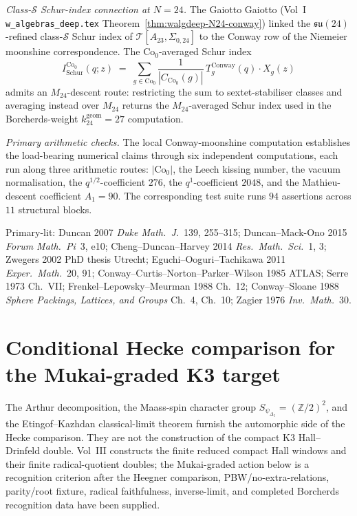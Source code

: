 \begin{remark}
\emph{Class-$\mathcal{S}$ Schur-index connection at $N = 24$.} The Gaiotto
Gaiotto (Vol~I \texttt{w\_algebras\_deep.tex}
Theorem~\ref{thm:walgdeep-N24-conway}) linked the
$\mathfrak{su}(24)$-refined class-$\mathcal{S}$ Schur index of
$\mathcal T[A_{23}, \Sigma_{0, 24}]$ to the Conway row of the Niemeier
moonshine correspondence. The $\mathrm{Co}_0$-averaged Schur index
\[
 I_{\mathrm{Schur}}^{\mathrm{Co}_0}(q; z)
 \;=\;
 \sum_{g \in \mathrm{Co}_0}
 \frac{1}{|C_{\mathrm{Co}_0}(g)|}\,
 T_g^{\mathrm{Conway}}(q) \cdot X_g(z)
\]
admits an $M_{24}$-descent route: restricting the sum to sextet-stabiliser
classes and averaging instead over $M_{24}$ returns the
$M_{24}$-averaged Schur index used in the Borcherds-weight
$k_{24}^{\mathrm{geom}} = 27$ computation.

\emph{Primary arithmetic checks.}
The local Conway-moonshine computation establishes the load-bearing
numerical claims through six independent
computations, each run along three arithmetic routes:
$|\mathrm{Co}_0|$, the Leech kissing number, the vacuum normalisation,
the $q^{1/2}$-coefficient $276$, the $q^{1}$-coefficient $2048$, and
the Mathieu-descent coefficient $A_1 = 90$. The corresponding test
suite runs $94$ assertions across $11$ structural blocks.

Primary-lit: Duncan 2007 \emph{Duke Math.\ J.}~139, 255--315;
Duncan--Mack-Ono 2015 \emph{Forum Math.\ Pi}~3, e10;
Cheng--Duncan--Harvey 2014 \emph{Res.~Math.~Sci.}~1, 3;
Zwegers 2002 PhD thesis Utrecht;
Eguchi--Ooguri--Tachikawa 2011 \emph{Exper.~Math.}~20, 91;
Conway--Curtis--Norton--Parker--Wilson 1985 ATLAS; Serre 1973 Ch.~VII;
Frenkel--Lepowsky--Meurman 1988 Ch.~12;
Conway--Sloane 1988 \emph{Sphere Packings, Lattices, and Groups} Ch.~4, Ch.~10;
Zagier 1976 \emph{Inv.~Math.}~30.
\end{remark}

\section{Conditional Hecke comparison for the Mukai-graded K3 target}
\label{sec:dl-tempered-hecke}

The Arthur decomposition, the Maass-spin character group
$S_{\psi_{\Delta_5}} = (\mathbb{Z}/2)^2$, and the Etingof--Kazhdan
classical-limit theorem furnish the automorphic side of the Hecke
comparison. They are not the construction of the compact K3
Hall--Drinfeld double.
Vol~III constructs the finite reduced compact Hall windows and their
finite radical-quotient doubles; the Mukai-graded action below is a
recognition criterion after the Heegner comparison,
PBW/no-extra-relations, parity/root fixture, radical faithfulness,
inverse-limit, and completed Borcherds recognition data have been
supplied.

